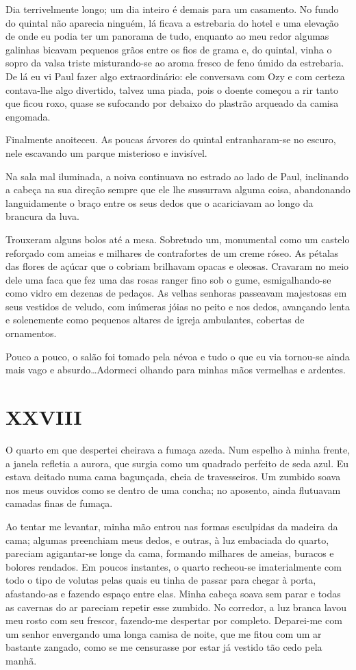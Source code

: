 Dia terrivelmente longo; um dia inteiro é demais para um casamento. No fundo do quintal não aparecia ninguém, lá ficava a estrebaria do hotel e uma elevação de onde eu podia ter um panorama de tudo, enquanto ao meu redor algumas galinhas bicavam pequenos grãos entre os fios de grama e, do quintal, vinha o sopro da valsa triste misturando-se ao aroma fresco de feno úmido da estrebaria. De lá eu vi Paul fazer algo extraordinário: ele conversava com Ozy e com certeza contava-lhe algo divertido, talvez uma piada, pois o doente começou a rir tanto que ficou roxo, quase se sufocando por debaixo do plastrão arqueado da camisa engomada.

Finalmente anoiteceu. As poucas árvores do quintal entranharam-se no escuro, nele escavando um parque misterioso e invisível.

Na sala mal iluminada, a noiva continuava no estrado ao lado de Paul, inclinando a cabeça na sua direção sempre que ele lhe sussurrava alguma coisa, abandonando languidamente o braço entre os seus dedos que o acariciavam ao longo da brancura da luva.

Trouxeram alguns bolos até a mesa. Sobretudo um, monumental como um castelo reforçado com ameias e milhares de contrafortes de um creme róseo. As pétalas das flores de açúcar que o cobriam brilhavam opacas e oleosas. Cravaram no meio dele uma faca que fez uma das rosas ranger fino sob o gume, esmigalhando-se como vidro em dezenas de pedaços. As velhas senhoras passeavam majestosas em seus vestidos de veludo, com inúmeras jóias no peito e nos dedos, avançando lenta e solenemente como pequenos altares de igreja ambulantes, cobertas de ornamentos.

Pouco a pouco, o salão foi tomado pela névoa e tudo o que eu via tornou-se ainda mais vago e absurdo\dots Adormeci olhando para minhas mãos vermelhas e ardentes.


\chapter*{\centering\Large{XXVIII}}

O quarto em que despertei cheirava a fumaça azeda. Num espelho à minha frente, a janela refletia a aurora, que surgia como um quadrado perfeito de seda azul. Eu estava deitado numa cama bagunçada, cheia de travesseiros. Um zumbido soava nos meus ouvidos como se dentro de uma concha; no aposento, ainda flutuavam camadas finas de fumaça.

Ao tentar me levantar, minha mão entrou nas formas esculpidas da madeira da cama; algumas preenchiam meus dedos, e outras, à luz embaciada do quarto, pareciam agigantar-se longe da cama, formando milhares de ameias, buracos e bolores rendados. Em poucos instantes, o quarto recheou-se imaterialmente com todo o tipo de volutas pelas quais eu tinha de passar para chegar à porta, afastando-as e fazendo espaço entre elas. Minha cabeça soava sem parar e todas as cavernas do ar pareciam repetir esse zumbido. No corredor, a luz branca lavou meu rosto com seu frescor, fazendo-me despertar por completo. Deparei-me com um senhor envergando uma longa camisa de noite, que me fitou com um ar bastante zangado, como se me censurasse por estar já vestido tão cedo pela manhã.


